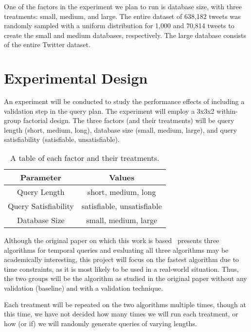 \documentclass{acm_proc_article-sp}
\begin{document}
One of the factors in the experiment we plan to run is database size, with three treatments: small, medium, and large. The entire dataset of 638,182 tweets was randomly sampled with a uniform distribution for 1,000 and 70,814 tweets to create the small and medium databases, respectively. The large database consists of the entire Twitter dataset. 

\section{Experimental Design}
An experiment will be conducted to study the performance effects of including a validation step in the query plan. The experiment will employ a 3x3x2 within-group factorial design. The three factors (and their treatments) will be query length (short, medium, long), database size (small, medium, large), and query satisfiability (satisfiable, unsatisfiable). 

\begin{table}\centering
\begin{tabular}{|c|c|}\hline
\textbf{Parameter} & \textbf{Values}\\\hline
Query Length & {short, medium, long}\\\hline
Query Satisfiability & {satisfiable, unsatisfiable}\\\hline
Database Size & {small, medium, large}\\\hline
\end{tabular}
\caption{A table of each factor and their treatments.}\label{tab:factors}
\end{table}

Although the original paper on which this work is based~\cite{Li:2011} presents three algorithms for temporal queries and evaluating all three algorithms may be academically interesting, this project will focus on the fastest algorithm due to time constraints, as it is most likely to be used in a real-world situation. Thus, the two groups will be the algorithm as studied in the original paper without any validation (baseline) and with a validation technique. 

Each treatment will be repeated on the two algorithms multiple times, though at this time, we have not decided how many times we will run each treatment, or how (or if) we will randomly generate queries of varying lengths.



\end{document}
